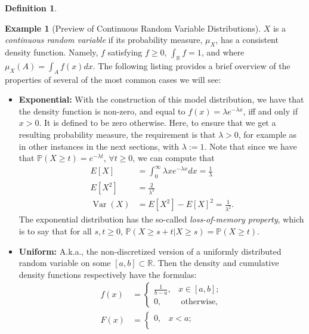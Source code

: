 \documentclass[12pt,reqno]{article}
\renewcommand{\emph}[1]{\textit{#1}}
\theoremstyle{plain}
\theoremstyle{definition}
\newtheorem{definition}[theorem]{Definition}
\newtheorem{example}[theorem]{Example}
\newcommand{\PP}[1]{\ensuremath{\mathbb{P}\left(#1\right)}}
\begin{document}
\begin{definition}
\begin{itemize}
\end{itemize} 
\end{definition} 

\begin{example}[Preview of Continuous Random Variable Distributions] 
$X$ is a \emph{continuous random variable} if its probability measure, $\mu_X$, has 
a consistent density function. Namely, $f$ satisfying $f \geq 0$, 
$\int_{\mathbb{R}} f = 1$, and where $\mu_X(A) = \int_A f(x) dx$. The following 
listing provides a brief overview of the properties of several of the most common 
cases we will see: 
\begin{itemize} 

\item \textbf{Exponential:} With the construction of this model distribution, we have that 
     the density function is non-zero, and equal to $f(x) = \lambda e^{-\lambda x}$, iff and only 
     if $x > 0$. It is defined to be zero otherwise. Here, to ensure that we get a resulting 
     probability measure, the requirement is that $\lambda > 0$, for example as in other 
     instances in the next sections, with $\lambda := 1$. 
     Note that since we have that $\PP{X \geq t} = e^{-\lambda t}$, 
     $\forall t \geq 0$, we can compute that 
     \begin{align*} 
     E[X] & = \int_0^{\infty} \lambda x e^{-\lambda x} dx = \frac{1}{\lambda} \\ 
     E[X^2] & = \frac{2}{\lambda^2} \\ 
     \operatorname{Var}(X) & = E[X^2]-E[X]^2 = \frac{1}{\lambda^2}. 
     \end{align*} 
     The exponential distribution has the so-called 
     \emph{loss-of-memory property}, which is to say that for all 
     $s,t \geq 0$, $\PP{X \geq s+t | X \geq s} = \PP{X \geq t}$. 
\item \textbf{Uniform:} A.k.a., the non-discretized version of a uniformly distributed random 
     variable on some $[a,b] \subset \mathbb{R}$. Then the density and cumulative density 
     functions respectively have the formulas: 
     \begin{align*} 
     f(x) & = \begin{cases} 
          \frac{1}{b-a}, & x \in [a,b]; \\ 
          0, & \text{ otherwise, } 
          \end{cases} \\ 
      F(x) & = \begin{cases} 
           0, & x < a; \\ 

\end{cases}
\end{align*}
\end{itemize}
\end{example}
\end{document}
